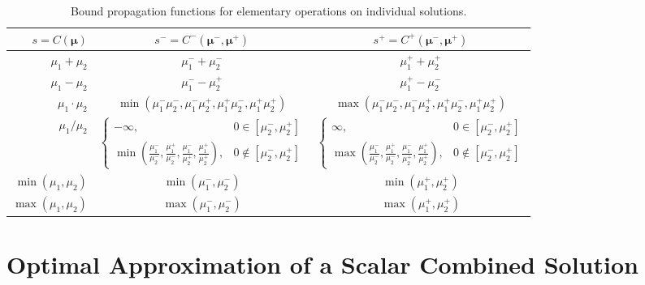 \documentclass[graybox]{svmult}
\begin{document}
\begin{table}[t]
\begin{tabular}{r  c  c}
    $s=C(\boldsymbol{\mu})$ & $s^- = C^-(\boldsymbol{\mu}^-,\boldsymbol{\mu}^+)$ & $s^+ = C^+(\boldsymbol{\mu}^-,\boldsymbol{\mu}^+)$ \\
    \hline
    $\mu_1+\mu_2$ & $\mu_1^-+\mu_2^-$ & $\mu_1^++\mu_2^+$ \\
    $\mu_1-\mu_2$ & $\mu_1^--\mu_2^+$ & $\mu_1^+-\mu_2^-$ \\
    $\mu_1 \cdot \mu_2$ & $\min(\mu_1^-\mu_2^-,\mu_1^-\mu_2^+,\mu_1^+\mu_2^-,\mu_1^+\mu_2^+)$ & $\max(\mu_1^-\mu_2^-,\mu_1^-\mu_2^+,\mu_1^+\mu_2^-,\mu_1^+\mu_2^+)$ \\
    $\mu_1 / \mu_2$ & $\begin{cases} -\infty, & 0 \in [\mu_2^-,\mu_2^+] \\ \min\left(\frac{\mu_1^-}{\mu_2^-},\frac{\mu_1^+}{\mu_2^-},\frac{\mu_1^-}{\mu_2^+},\frac{\mu_1^+}{\mu_2^+}\right), & 0 \notin [\mu_2^-,\mu_2^+] \end{cases}$ & $\begin{cases} \infty, & 0 \in [\mu_2^-,\mu_2^+] \\ \max\left(\frac{\mu_1^-}{\mu_2^-},\frac{\mu_1^+}{\mu_2^-},\frac{\mu_1^-}{\mu_2^+},\frac{\mu_1^+}{\mu_2^+}\right), & 0 \notin [\mu_2^-,\mu_2^+] \end{cases}$ \\
    $\min(\mu_1,\mu_2)$ & $\min(\mu_1^-,\mu_2^-)$ & $\min(\mu_1^+,\mu_2^+)$ \\
    $\max(\mu_1,\mu_2)$ & $\max(\mu_1^-,\mu_2^-)$ & $\max(\mu_1^+,\mu_2^+)$ \\
    \hline
\end{tabular}
\caption{Bound propagation functions for elementary operations on individual solutions.}
\label{SoRa_table:elementary_ops_Cpm}
\end{table}

\section{Optimal Approximation of a Scalar Combined Solution} \label{SoRa_sec:opt_comb_sol_sc}
\end{document}
